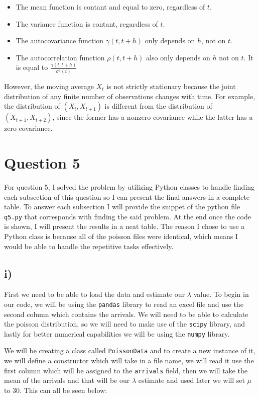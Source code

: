 \documentclass[11pt, letterpaper]{article}
\begin{document}
\begin{itemize}
	\item The mean function is contant and equal to zero, regardless of
	      $t$.
	\item The variance function is contant, regardless of $t$.
	\item The autocovariance function $\gamma (t, t+h)$ only depends on
	      $h$, not on
	      $t$.
	\item The autocorrelation function $\rho (t, t+h)$ also only depends on
	      $h$ not on
	      $t$. It is equal to $\frac{\gamma (t, t+h)}{\sigma^2(t)}$
\end{itemize}

However, the moving average $X_t$ is not strictly stationary because the joint
distribution of any finite number of observations changes with time. For
example, the distribution of $(X_t, X_{t+1})$ is different from the
distribution of
$(X_{t+1}, X_{t+2})$, since the former has a nonzero covariance while the
latter has a
zero covariance.
\newpage
\section*{Question 5}

For question 5, I solved the problem by utilizing Python classes to handle
finding each subsection of this question
so I can present the final answers in a complete table. To answer each
subsection I will provide the snippet of the python
file \verb|q5.py| that corresponds with finding the said problem. At the end
once the code is shown, I will present the
results in a neat table. The reason I chose to use a Python class is because
all of the poisson files were identical,
which means I would be able to handle the repetitive tasks effectively.

\subsection*{i)}
First we need to be able to load the data and estimate our $\lambda$ value. To
begin in our code, we will be using the
\verb|pandas| library to read an excel file and use the second column which
contains the arrivals. We will need to be able
to calculate the poisson distribution, so we will need to make use of the
\verb|scipy| library, and lastly for better
numerical capabilities we will be using the \verb|numpy| library.

We will be creating a class called \verb|PoissonData| and to create a new
instance of it, we will define a constructor
which will take in a file name, we will read it use the first column which will
be assigned to the \verb|arrivals| field,
then we will take the mean of the arrivals and that will be our $\lambda$
estimate and used later we will set $\mu$ to 30.
This can all be seen below:
\end{document}
